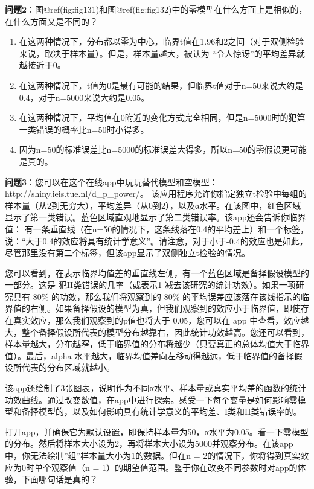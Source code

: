 \documentclass[
  letterpaper,
  DIV=11,
  numbers=noendperiod]{scrreprt}
\providecommand{\tightlist}{%
  \setlength{\itemsep}{0pt}\setlength{\parskip}{0pt}}\usepackage{longtable,booktabs,array}
\begin{document}
\textbf{问题2}：图@ref(fig:fig131)和图@ref(fig:fig132)中的零模型在什么方面上是相似的，在什么方面又是不同的？

\begin{enumerate}
\def\labelenumi{\Alph{enumi})}
\tightlist
\item
  在这两种情况下，分布都以零为中心，临界t值在1.96和2之间（对于双侧检验来说，取决于样本量）。但是，样本量越大，被认为
  ``令人惊讶''的平均差异就越接近于0。
\item
  在这两种情况下，t值为0是最有可能的结果，但临界t值对于n=50来说大约是0.4，对于n=5000来说大约是0.05。
\item
  在这两种情况下，平均值在0附近的变化方式完全相同，但是n=5000时的犯第一类错误的概率比n=50时小得多。
\item
  因为n=50的标准误差比n=5000的标准误差大得多，所以n=50的零假设更可能是真的。
\end{enumerate}

\textbf{问题3}：您可以在这个在线app中玩玩替代模型和空模型：http://shiny.ieis.tue.nl/d\_p\_power/。
该应用程序允许你指定独立t检验中每组的样本量（从2到无穷大），平均差异（从0到2），以及α水平。在该图中，红色区域显示了第一类错误。蓝色区域直观地显示了第二类错误率。该app还会告诉你临界值：
有一条垂直线（在n=50的情况下，这条线落在0.4的平均差上）和一个标签，说：``大于0.4的效应将具有统计学意义''。请注意，对于小于-0.4的效应也是如此，尽管那里没有第二个标签，但该app显示了双侧独立t检验的情况。

您可以看到，在表示临界均值差的垂直线左侧，有一个蓝色区域是备择假设模型的一部分。这是
犯II类错误的几率（或表示1 减去该研究的统计功效）。如果一项研究具有 80\%
的功效，那么我们将观察到的 80\%
的平均误差应该落在该线指示的临界值的右侧。如果备择假设的模型为真，但我们观察到的效应小于临界值，即使存在真实效应，那么我们观察到的p值也将大于
0.05，您可以在 app
中查看，效应越大，整个备择假设所代表的模型分布越靠右，因此统计功效越高。您还可以看到，样本量越大，分布越窄，低于临界值的分布将越少（只要真正的总体均值大于临界值）。最后，alpha
水平越大，临界均值差向左移动得越远，低于临界值的备择假设所代表的分布区域就越小。

该app还绘制了3张图表，说明作为不同α水平、样本量或真实平均差的函数的统计功效曲线。通过改变数值，在app中进行探索。感受一下每个变量是如何影响零模型和备择模型的，以及如何影响具有统计学意义的平均差、I类和II类错误率的。

打开app，并确保它为默认设置，即保持样本量为50，α水平为0.05。看一下零模型的分布。然后将样本大小设为2，再将样本大小设为5000并观察分布。在该app中，你无法绘制''组''样本量大小为1的数据。但在n
= 2的情况下，你将得到真实效应为0时单个观察值（n =
1）的期望值范围。鉴于你在改变不同参数时对app的体验，下面哪句话是真的？
\end{document}

